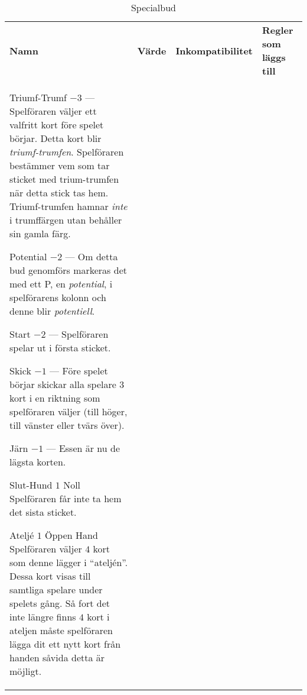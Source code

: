 %
%
%

\newcommand{\nonTrump}{\textnormal{icke-trumf-bud}}

\begin{table}
	\caption{Specialbud}\label{tab:specialBids}
	\begin{center}
		\begin{tabularx}{\textwidth}{lcp{3cm}|X}
			\textbf{Namn} &
			\textbf{Värde} &
			\textbf{Inkompatibilitet} &
			\textbf{Regler som läggs till}
			\\[-3ex]

			\specialBidItem%
			{Triumf-Trumf}
			{$-3$}
			{---}
			{%
				Spelföraren väljer ett valfritt kort före spelet börjar. Detta kort blir \emph{triumf-trumfen}. Spelföraren bestämmer vem som tar sticket med trium-trumfen när detta stick tas hem. Triumf-trumfen hamnar \emph{inte} i trumffärgen utan behåller sin gamla färg.
			}

			\specialBidItem%
			{Potential}
			{$-2$}
			{---}
			{%
				Om detta bud genomförs markeras det med ett P, en \emph{potential}, i spelförarens kolonn och denne blir \emph{potentiell}.
			}

			\specialBidItem%
			{Start}
			{$-2$}
			{---}
			{%
				Spelföraren spelar ut i första sticket.
			}

			\specialBidItem%
			{Skick}
			{$-1$}
			{---}
			{%
				Före spelet börjar skickar alla spelare $3$ kort i en riktning som spelföraren väljer (till höger, till vänster eller tvärs över).
			}

			\specialBidItem%
			{Järn}
			{$-1$}
			{---}
			{%
				Essen är nu de lägsta korten.
			}

			\specialBidItem%
			{Slut-Hund}
			{$1$}
			{Noll}
			{%
				Spelföraren får inte ta hem det sista sticket.
			}

			\specialBidItem%
			{Ateljé}
			{$1$}
			{Öppen Hand}
			{%
				Spelföraren väljer $4$ kort som denne lägger i ``ateljén''. Dessa kort visas till samtliga spelare under spelets gång. Så fort det inte längre finns $4$ kort i ateljen måste spelföraren lägga dit ett nytt kort från handen såvida detta är möjligt.
			}


\end{tabularx}
\end{center}
\end{table}
